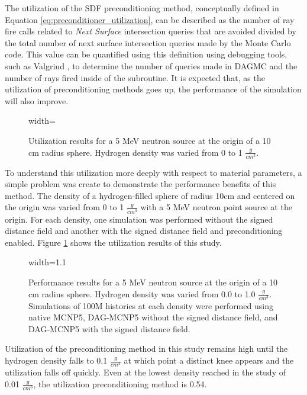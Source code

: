 The utilization of the SDF preconditioning method, conceptually defined in
Equation \eqref{eq:preconditioner_utilization}, can be described as the number of
ray fire calls related to \textit{Next Surface} intersection queries that
are avoided divided by the total number of next surface intersection queries
made by the Monte Carlo code. This value can be quantified using this definition
using debugging tools, such as Valgrind \cite{Pena_2016}, to determine the
number of queries made in DAGMC and the number of rays fired inside of the
subroutine.  It is expected that, as the utilization of preconditioning methods
goes up, the performance of the simulation will also improve.

\begin{figure}[ht]
  \centering
  {width=\textwidth}
  \caption[Utilization results for a simple SDF test case.]{Utilization results
    for a 5 MeV neutron source at the origin of a 10 cm radius sphere. Hydrogen
    density was varied from 0 to 1 $\frac{g}{cm^3}$.}
  \label{fig:sphere_hydrogen_density_study_util}
\end{figure}

To understand this utilization more deeply with respect to material parameters,
a simple problem was create to demonstrate the performance benefits of this
method. The density of a hydrogen-filled sphere of radius 10cm and centered on
the origin was varied from 0 to 1 $\frac{g}{cm^3}$ with a 5 MeV neutron point
source at the origin. For each density, one simulation was performed without the
signed distance field and another with the signed distance field and
preconditioning enabled. Figure \ref{fig:sphere_hydrogen_density_study_util}
shows the utilization results of this study.

\begin{figure}[ht]
  \centering
  {width=1.1\textwidth}
  \caption[A DAG-MCNP test simulation using SDF preconditioning.]{Performance results for a 5 MeV neutron source at the origin of a 10
    cm radius sphere. Hydrogen density was varied from 0.0 to 1.0
    $\frac{g}{cm^3}$. Simulations of 100M histories at each density were
    performed using native MCNP5, DAG-MCNP5 without the signed distance field,
    and DAG-MCNP5 with the signed distance field.}
  \label{fig:sphere_hydrogen_density_study_perf}
\end{figure}

Utilization of the preconditioning method in this study remains high until the
hydrogen density falls to 0.1 $\frac{g}{cm^3}$ at which point a distinct knee
appears and the utilization falls off quickly. Even at the lowest density
reached in the study of 0.01 $\frac{g}{cm^3}$, the utilization preconditioning
method is 0.54.


